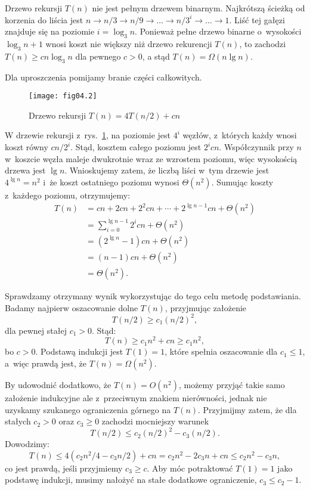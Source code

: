 \exercise %
Drzewo rekursji $T(n)$ nie jest pełnym drzewem binarnym. Najkrótszą ścieżką od korzenia do liścia jest $n\to n/3\to n/9\to\dots\to n/3^i\to\dots\to1$. Liść tej gałęzi znajduje się na poziomie $i=\log_3n$. Ponieważ pełne drzewo binarne o~wysokości $\log_3n+1$ wnosi koszt nie większy niż drzewo rekurencji $T(n)$, to zachodzi $T(n)\ge cn\log_3n$ dla pewnego $c>0$, a stąd $T(n)=\Omega(n\lg n)$.

\exercise %
Dla uproszczenia pomijamy branie części całkowitych.
\begin{figure}[ht]
	\begin{center}
		\texttt{[image: fig04.2]}
	\end{center}
	\caption{Drzewo rekursji $T(n)=4T(n/2)+cn$} \label{fig:4.2-3}
\end{figure}
W drzewie rekursji z~rys.~\ref{fig:4.2-3}, na  poziomie jest $4^i$ węzłów, z~których każdy wnosi koszt równy $cn/2^i$. Stąd, kosztem całego poziomu jest $2^icn$. Współczynnik przy $n$ w~koszcie węzła maleje dwukrotnie wraz ze wzrostem poziomu, więc wysokością drzewa jest $\lg n$. Wnioskujemy zatem, że liczbą liści w~tym drzewie jest $4^{\lg n}=n^2$ i~że koszt ostatniego poziomu wynosi $\Theta(n^2)$. Sumując koszty z~każdego poziomu, otrzymujemy:
\begin{align*}
	T(n) &= cn+2cn+2^2cn+\cdots+2^{\lg n-1}cn+\Theta(n^2) \\
	&= \sum_{i=0}^{\lg n-1}2^icn+\Theta(n^2) \\
	&= (2^{\lg n}-1)cn+\Theta(n^2) \\
	&= (n-1)cn+\Theta(n^2) \\
	&= \Theta(n^2).
\end{align*}

Sprawdzamy otrzymany wynik wykorzystując do tego celu metodę podstawiania. Badamy najpierw oszacowanie dolne $T(n)$, przyjmując założenie
\[
	T(n/2) \ge c_1(n/2)^2,
\]
dla pewnej stałej $c_1>0$. Stąd:
\[
	T(n) \ge c_1n^2+cn \ge c_1n^2,
\]
bo $c>0$. Podstawą indukcji jest $T(1)=1$, które spełnia oszacowanie dla $c_1\le1$, a~więc prawdą jest, że $T(n)=\Omega(n^2)$.

By udowodnić dodatkowo, że $T(n)=O(n^2)$, możemy przyjąć takie samo założenie indukcyjne ale z~przeciwnym znakiem nierówności, jednak nie uzyskamy szukanego ograniczenia górnego na $T(n)$. Przyjmijmy zatem, że dla stałych $c_2>0$ oraz $c_3\ge0$ zachodzi mocniejszy warunek
\[
	T(n/2) \le c_2(n/2)^2-c_3(n/2).
\]
Dowodzimy:
\[
	T(n) \le 4(c_2n^2\!/4-c_3n/2)+cn = c_2n^2-2c_3n+cn \le c_2n^2-c_3n,
\]
co jest prawdą, jeśli przyjmiemy $c_3\ge c$. Aby móc potraktować $T(1)=1$ jako podstawę indukcji, musimy nałożyć na stałe dodatkowe ograniczenie, $c_3\le c_2-1$.

